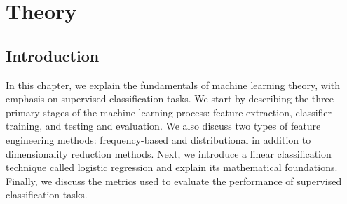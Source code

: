 
\chapter{Theory} %

\label{Chapter2} %


\section{Introduction} 

In this chapter, we explain the fundamentals of machine learning theory, with emphasis on supervised classification tasks. We start by describing the three primary stages of the machine learning process: feature extraction, classifier training, and testing and evaluation. We also discuss two types of feature engineering methods: frequency-based and distributional in addition to dimensionality reduction methods. Next, we introduce a linear classification technique called logistic regression and explain its mathematical foundations. Finally, we discuss the metrics used to evaluate the performance of supervised classification tasks.  


